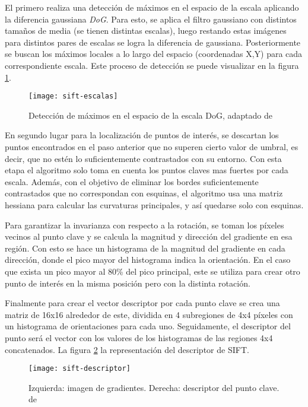 El primero realiza una detección de máximos en el espacio de la escala aplicando la diferencia gaussiana \textit{DoG}. Para esto, se aplica el filtro gaussiano con distintos tamaños de media (se tienen distintas escalas), luego restando estas imágenes para distintos pares de escalas se logra la diferencia de gaussiana. Posteriormente se buscan los máximos locales a lo largo del espacio (coordenadas X,Y) para cada correspondiente escala. Este proceso de detección se puede visualizar en la figura \ref{imagen:sift-escalas}.

\begin{figure}[H]
	\centering
	\texttt{[image: sift-escalas]}
	\caption[Detector SIFT]{Detección de máximos en el espacio de la escala DoG, adaptado de \cite{sift}}
	\label{imagen:sift-escalas}
\end{figure}

En segundo lugar para la localización de puntos de interés, se descartan los puntos encontrados en el paso anterior que no superen cierto valor de umbral, es decir, que no estén lo suficientemente contrastados con su entorno. Con esta etapa el algoritmo solo toma en cuenta los puntos claves mas fuertes por cada escala. Además, con el objetivo de eliminar los bordes suficientemente contrastados que no correspondan con esquinas, el algoritmo usa una matriz hessiana para calcular las curvaturas principales, y así quedarse solo con esquinas.

Para garantizar la invarianza con respecto a la rotación, se toman los píxeles vecinos al punto clave y se calcula la magnitud y dirección del gradiente en esa región. Con esto se hace un histograma de la magnitud del gradiente en cada dirección, donde el pico mayor del histograma indica la orientación. En el caso que exista un pico mayor al 80\% del pico principal, este se utiliza para crear otro punto de interés en la misma posición pero con la distinta rotación.

Finalmente para crear el vector descriptor por cada punto clave se crea una matriz de 16x16 alrededor de este, dividida en 4 subregiones de 4x4 píxeles con un histograma de orientaciones para cada uno. Seguidamente, el descriptor del punto será el vector con los valores de los histogramas de las regiones 4x4 concatenados. La figura \ref{imagen:descriptor} la representación del descriptor de SIFT.

\begin{figure}[H]
	\centering
	\texttt{[image: sift-descriptor]}
	\caption[Descriptor SIFT]{Izquierda: imagen de gradientes. Derecha: descriptor del punto clave. de \cite{sift}}
	\label{imagen:descriptor}
\end{figure}


